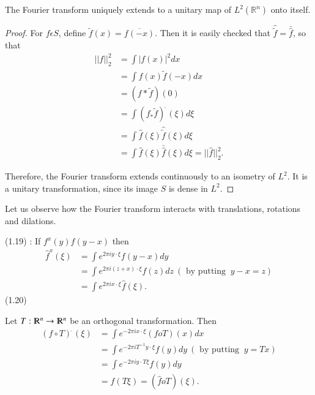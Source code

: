 \setcounter{thm}{17}
\begin{thm}\label{chap1:sec2:thm1.18} %
  The Fourier transform uniquely extends to a unitary map of $L^2
  (\mathbb{R}^n)$ onto itself. 
\end{thm}

\begin{proof}
  For $f \epsilon S$, define $\tilde{f}(x) = \overline{f(-x)}$. Then
  it is easily checked that $\hat{\tilde{f}}=\bar{\hat{f}}$, so that  
  \begin{align*}
    || f ||^2_2 & = \int |f(x)|^2 dx \\
    & = \int f(x) \tilde{f}(-x) dx \\
    & = (f * \tilde{f}) (0)\\
    & = \int (f_* \tilde{f})^{\hat{~}} (\xi ) d \xi\\
    & = \int \hat{f}(\xi ) \hat{\tilde{f}}(\xi ) d \xi \\
    & = \int \hat{f}(\xi ) \bar{\hat{f}}(\xi) d \xi = || \hat{f}||^2_2.
  \end{align*}

  Therefore, the Fourier transform extends continuously to an isometry
  of $L^2$. It is a unitary transformation, since its image $S$ is dense
  in $ L^2$. 
\end{proof}

Let us observe how the Fourier transform interacts with translations,
rotations and dilations.  

\noindent (1.19) : If $f^x(y) f(y-x)$ then  
\begin{align*}
  \hat{f}^x (\xi) & = \int e^{2 \pi i y \cdot \xi } f(y-x) dy \\
  & = \int e^{2 \pi i (z+x)\cdot \xi} f(z) dz ~(\text{ by putting }~ y-x = z ) \\
  & = \int e^{2 \pi ix\cdot \xi } \hat{f}(\xi).
\end{align*}
(1.20) 

Let $T: \varmathbb{R}^n \to \varmathbb{R}^n$ be an orthogonal
transformation. Then  
\begin{align*}
  (f \circ T)^{\hat{~}}(\xi) & = \int e^{-2 \pi ix\cdot \xi } (f o T) (x)dx \\
  & = \int e^{-2 \pi iT^{-1}y \cdot \xi} f(y)dy ~(\text{ by putting } ~y = Tx )\\
  & = \int e^{-2 \pi iy \cdot T \xi }f(y)dy \\
  & = \hat{f}(T \xi ) = (\hat{f} o T) (\xi).
\end{align*}

